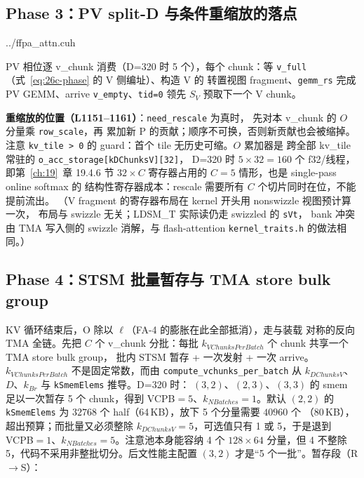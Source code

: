 \subsection{Phase 3：PV split-D 与条件重缩放的落点}\label{sec:26c-pv}

\begin{lstinputlisting}[linerange={1133-1165},firstnumber=auto,
  title={ffpa\_attn.cuh L1133-1165（Phase 3：$O_v \mathrel{+}= P V_v$ 与 lazy rescale）}]{../ffpa_attn.cuh}
\end{lstinputlisting}

PV 相位逐 v\_chunk 消费（D=320 时 5 个），每个 chunk：等
\texttt{v\_full}（式~\eqref{eq:26c-phase} 的 V 侧编址）、构造 V 的
转置视图 fragment、\texttt{gemm\_rs} 完成 PV GEMM、arrive
\texttt{v\_empty}、\texttt{tid=0} 领先 $S_V$ 预取下一个 V chunk。

\textbf{重缩放的位置（L1151--1161）}：\texttt{need\_rescale} 为真时，
先对本 v\_chunk 的 $O$ 分量乘 \texttt{row\_scale}，再
累加新 P 的贡献；顺序不可换，否则新贡献也会被缩掉。注意
\texttt{kv\_tile > 0} 的 guard：首个 tile 无历史可缩。$O$ 累加器是
跨全部 kv\_tile 常驻的 \texttt{o\_acc\_storage[kDChunksV][32]}，
D=320 时 $5\times32=160$ 个 f32/线程，即第~\ref{ch:19}~章 19.4.6 节
$32 \times C$ 寄存器占用的 $C{=}5$ 情形，也是 single-pass online softmax 的
结构性寄存器成本：rescale 需要所有 $C$ 个切片同时在位，不能提前流出。
（V fragment 的寄存器布局在 kernel 开头用 nonswizzle 视图预计算一次，
布局与 swizzle 无关；LDSM\_T 实际读仍走 swizzled 的 \texttt{sVt}，
bank 冲突由 TMA 写入侧的 swizzle 消解，与 flash-attention
\texttt{kernel\_traits.h} 的做法相同。）

\subsection{Phase 4：STSM 批量暂存与 TMA store bulk group}\label{sec:26c-epilogue}

KV 循环结束后，O 除以 $\ell$（FA-4 的膨胀在此全部抵消），走与装载
对称的反向 TMA 全链。先把 $C$ 个 v\_chunk 分批：每批
$k_{VChunksPerBatch}$ 个 chunk 共享一个 TMA store bulk group，
批内 STSM 暂存 + 一次发射 + 一次 arrive。
$k_{VChunksPerBatch}$ 不是固定常数，而由
\texttt{compute\_\allowbreak{}vchunks\_\allowbreak{}per\_\allowbreak{}batch} 从
$k_{DChunksV}$、$D$、$k_{Br}$ 与 \texttt{kSmemElems} 推导。D=320 时：
$(3,2)$、$(2,3)$、$(3,3)$ 的 smem 足以一次暂存 5 个 chunk，得到
VCPB$=5$、$k_{NBatches}{=}1$。默认 $(2,2)$ 的 \texttt{kSmemElems}
为 $32768$ 个 half（64\,KB），放下 5 个分量需要 $40960$ 个
（80\,KB），超出预算；而批量又必须整除 $k_{DChunksV}{=}5$，可选值只有
1 或 5，于是退到 VCPB$=1$、$k_{NBatches}{=}5$。注意池本身能容纳 4 个
$128\times64$ 分量，但 4 不整除 5，代码不采用非整批切分。后文性能主配置
$(3,2)$ 才是“5 个一批”。暂存段（R$\to$S）：

